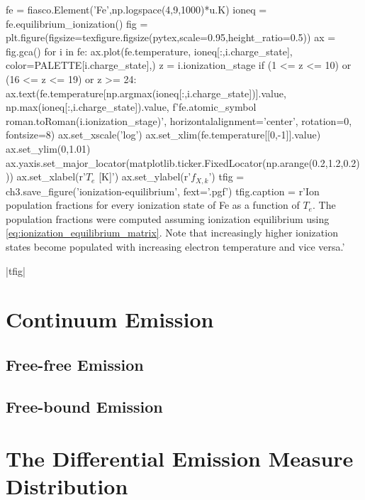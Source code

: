 \begin{pycode}[chapter3]
fe = fiasco.Element('Fe',np.logspace(4,9,1000)*u.K)
ioneq = fe.equilibrium_ionization()
fig = plt.figure(figsize=texfigure.figsize(pytex,scale=0.95,height_ratio=0.5))
ax = fig.gca()
for i in fe:
    ax.plot(fe.temperature, ioneq[:,i.charge_state],
            color=PALETTE[i.charge_state],)
    z = i.ionization_stage
    if (1 <= z <= 10) or (16 <= z <= 19) or z >= 24:
        ax.text(fe.temperature[np.argmax(ioneq[:,i.charge_state])].value,
                np.max(ioneq[:,i.charge_state]).value,
                f'{fe.atomic_symbol} {roman.toRoman(i.ionization_stage)}',
                horizontalalignment='center', rotation=0,
                fontsize=8)
ax.set_xscale('log')
ax.set_xlim(fe.temperature[[0,-1]].value)
ax.set_ylim(0,1.01)
ax.yaxis.set_major_locator(matplotlib.ticker.FixedLocator(np.arange(0.2,1.2,0.2)))
ax.set_xlabel(r'$T_e$ [K]')
ax.set_ylabel(r'$f_{X,k}$')
tfig = ch3.save_figure('ionization-equilibrium', fext='.pgf')
tfig.caption = r'Ion population fractions for every ionization state of Fe as a function of $T_e$. The population fractions were computed assuming ionization equilibrium using \autoref{eq:ionization_equilibrium_matrix}. Note that increasingly higher ionization states become populated with increasing electron temperature and vice versa.'
\end{pycode}
\py[chapter3]|tfig|

\section{Continuum Emission}\label{sec:continuum}


\subsection{Free-free Emission}

\subsection{Free-bound Emission}

\section{The Differential Emission Measure Distribution}\label{sec:dem}

